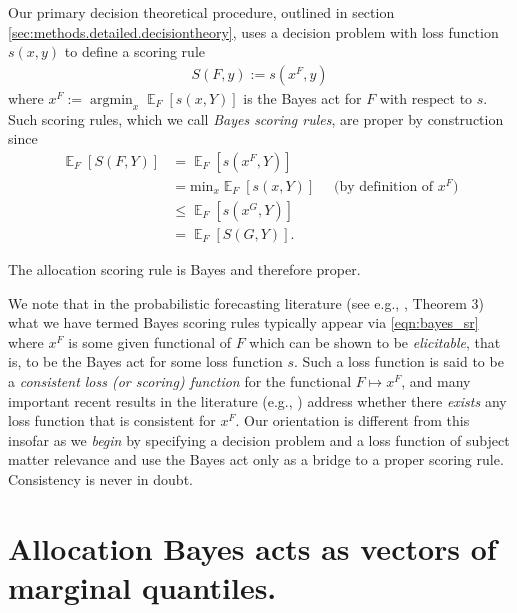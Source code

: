 \documentclass{article}\usepackage[]{graphicx}\usepackage[]{xcolor}
\DeclareMathOperator*{\argmin}{argmin}
\DeclareMathOperator{\Ex}{\mathbb{E}}
\begin{document}
Our primary decision theoretical procedure, outlined in section \ref{sec:methods.detailed.decisiontheory},
uses a decision problem with loss function $s(x,y)$ to define a scoring rule
\begin{align}
S(F,y) := s(x^F,y) \label{eqn:bayes_sr}
\end{align}
where $x^F := \argmin_{x} \Ex_F[s(x,Y)]$ is the Bayes act for $F$ with respect to $s$.
Such scoring rules, which we call \emph{Bayes scoring rules},
are proper by construction since
\begin{align}
\Ex_F [S(F, Y)] &= \Ex_F [ s(x^F, Y) ] \nonumber \\
 &= \mathrm{min}_{x} \Ex_F [ s(x, Y) ] \quad \text{ (by definition of $x^F$)} \\
 &\leq \Ex_F [ s(x^G, Y) ] \label{eqn:dt_proper_key} \\
 &= \Ex_F [ S(G, Y)]. \nonumber
\end{align}

The allocation scoring rule is Bayes and therefore proper.

We note that in the probabilistic forecasting literature (see e.g., \cite{gneiting2011making}, Theorem 3) what we have
termed Bayes scoring rules typically appear via \eqref{eqn:bayes_sr} where $x^F$ is some given functional of $F$ which
can be shown to be \emph{elicitable}, that is, to be the Bayes act for some loss function $s$. Such a loss function is
said to be a \emph{consistent loss (or scoring) function} for the functional $F \mapsto x^F$, and many important recent
results in the literature (e.g., \cite{fisslerziegel2016consistency}) address whether there \emph{exists} any loss
function that is consistent for $x^F$. Our orientation is different from this insofar as we \emph{begin} by specifying a
decision problem and a loss function of subject matter relevance and use the Bayes act only as a bridge to a proper
scoring rule.  Consistency is never in doubt.

\section{Allocation Bayes acts as vectors of marginal quantiles.}
\label{sec:a:bayes-quantiles}
\end{document}
